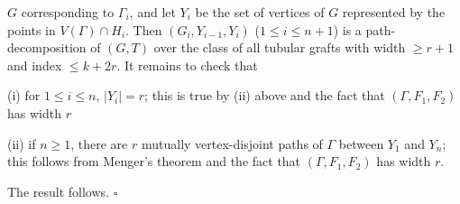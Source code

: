 \noindent $G$ corresponding to $\Gamma_i$, and let $Y_i$ be the set of vertices of $G$ represented by the points in $V(\Gamma) \cap H_i$. Then $(G_i, Y_{i-1}, Y_i)$ ($1 \le i \le n+1$) is a path-decomposition of $(G, T)$ over the class of all tubular grafts with width $\ge r + 1$ and index $\le k + 2r$. It remains to check that

\hspace*{12pt}(i) for $1 \le i \le n$, $|Y_i| = r$; this is true by (ii) above and the fact that $(\Gamma, F_1, F_2)$ has width $r$

\hspace*{12pt}(ii) if $n \ge 1$, there are $r$ mutually vertex-disjoint paths of $\Gamma$ between $Y_1$ and $Y_n$; this follows from Menger's theorem and the fact that $(\Gamma, F_1, F_2)$ has width $r$.

The result follows. $\square$

